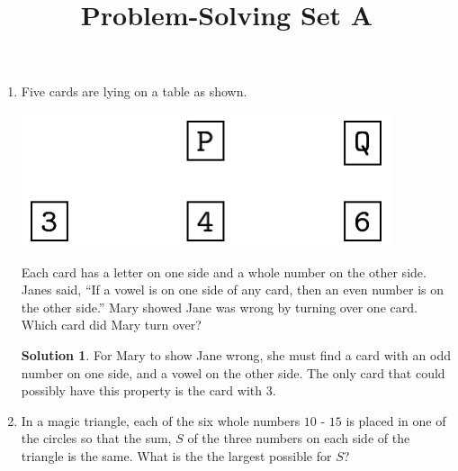 \documentclass{article}
\title{Problem-Solving Set A}
\author{}
\date{}
\theoremstyle{definition}
\newtheorem*{solution}{Solution}
\begin{document}
\maketitle
\begin{multicols*}{2}
    \begin{enumerate}
        \item Five cards are lying on a table as shown.
            \begin{center}
                \includegraphics[scale=0.25]{5-2_cards.png}
            \end{center}
            Each card has a letter on one side and a whole number on the other side.
            Janes said, ``If a vowel is on one side of any card, then an even number is on the other side.''
            Mary showed Jane was wrong by turning over one card.
            Which card did Mary turn over?
            \begin{solution}
                For Mary to show Jane wrong, she must find a card with an odd number on one side, and a vowel on the other side.
                The only card that could possibly have this property is the card with $3$.
            \end{solution}
        \item In a magic triangle, each of the six whole numbers $10$ - $15$ is placed in one of the circles so that the sum, $S$ of the three numbers on each side of the triangle is the same.
            What is the the largest possible for $S$?
            \begin{center}
\end{center}
\end{enumerate}
\end{multicols*}
\end{document}
